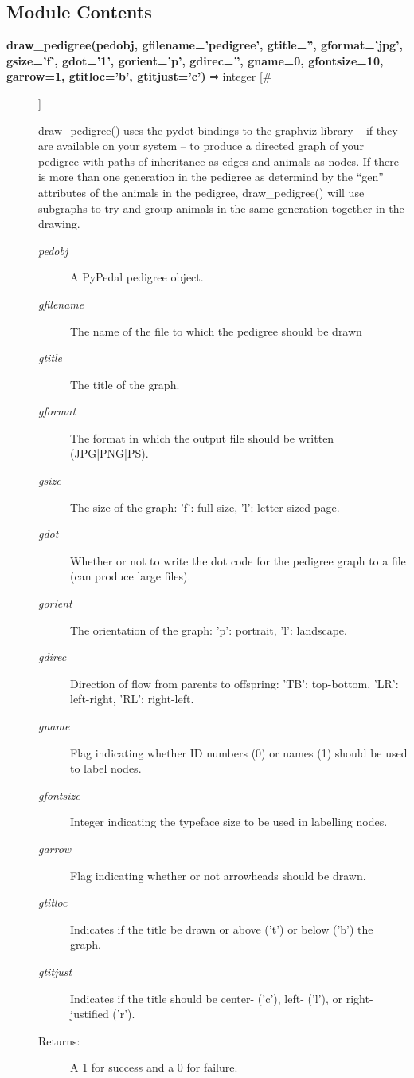 \subsection*{Module Contents}
\begin{description}
\item[\textbf{draw\_pedigree(pedobj, gfilename='pedigree', gtitle='', gformat='jpg', gsize='f', gdot='1', gorient='p', gdirec='', gname=0, gfontsize=10, garrow=1, gtitloc='b', gtitjust='c')}
 ⇒ integer [\#]]

 draw\_pedigree() uses the pydot bindings to the graphviz library -- if they are available on your system -- to produce a directed graph of your pedigree with paths of inheritance as edges and animals as nodes. If there is more than one generation in the pedigree as determind by the ``gen'' attributes of the animals in the pedigree, draw\_pedigree() will use subgraphs to try and group animals in the same generation together in the drawing.
\begin{description}
\item[\emph{pedobj}
] A PyPedal pedigree object.
\item[\emph{gfilename}
] The name of the file to which the pedigree should be drawn
\item[\emph{gtitle}
] The title of the graph.
\item[\emph{gformat}
] The format in which the output file should be written (JPG|PNG|PS).
\item[\emph{gsize}
] The size of the graph: 'f': full-size, 'l': letter-sized page.
\item[\emph{gdot}
] Whether or not to write the dot code for the pedigree graph to a file (can produce large files).
\item[\emph{gorient}
] The orientation of the graph: 'p': portrait, 'l': landscape.
\item[\emph{gdirec}
] Direction of flow from parents to offspring: 'TB': top-bottom, 'LR': left-right, 'RL': right-left.
\item[\emph{gname}
] Flag indicating whether ID numbers (0) or names (1) should be used to label nodes.
\item[\emph{gfontsize}
] Integer indicating the typeface size to be used in labelling nodes.
\item[\emph{garrow}
] Flag indicating whether or not arrowheads should be drawn.
\item[\emph{gtitloc}
] Indicates if the title be drawn or above ('t') or below ('b') the graph.
\item[\emph{gtitjust}
] Indicates if the title should be center- ('c'), left- ('l'), or right-justified ('r').
\item[Returns:] A 1 for success and a 0 for failure.


\end{description}
\end{description}
